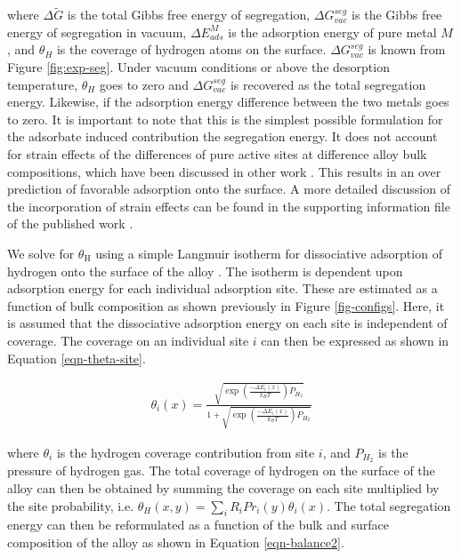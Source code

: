 \documentclass[12pt]{cmuthesis}
\begin{document}
\noindent
where \(\Delta \widetilde{G}\) is the total Gibbs free energy of segregation, \(\Delta G^{seg}_{vac}\) is the Gibbs free energy of segregation in vacuum, \(\Delta E^{M}_{ads}\) is the adsorption energy of pure metal \(M\), and \(\theta_{H}\) is the coverage of hydrogen atoms on the surface. \(\Delta G^{seg}_{vac}\) is known from Figure \ref{fig:exp-seg}.  Under vacuum conditions or above the desorption temperature, \(\theta_{H}\) goes to zero and \(\Delta G^{seg}_{vac}\) is recovered as the total segregation energy. Likewise, if the adsorption energy difference between the two metals goes to zero. It is important to note that this is the simplest possible formulation for the adsorbate induced contribution the segregation energy. It does not account for strain effects of the differences of pure active sites at difference alloy bulk compositions, which have been discussed in other work \cite{roudgar-2005-hydrog}. This results in an over prediction of favorable adsorption onto the surface. A more detailed discussion of the incorporation of strain effects can be found in the supporting information file of the published work \cite{boes-2015-estim-bulk}.

We solve for \(\theta_{\text{H}}\) using a simple Langmuir isotherm for dissociative adsorption of hydrogen onto the surface of the alloy \cite{miller-2012-segreg-at}. The isotherm is dependent upon adsorption energy for each individual adsorption site. These are estimated as a function of bulk composition as shown previously in Figure \ref{fig-configs}. Here, it is assumed that the dissociative adsorption energy on each site is independent of coverage. The coverage on an individual site \(i\) can then be expressed as shown in Equation \eqref{eqn-theta-site}.

\begin{eqnarray}
\theta_{i} (x) = \frac{\sqrt{\exp\left(\frac{-\Delta E_{i}(x)}{k_{B} T}\right) P_{H_2}}}{1 + \sqrt{\exp\left(\frac{-\Delta E_{i}(x)}{k_{B} T}\right) P_{H_2}}}
\label{eqn-theta-site}
\end{eqnarray}

\noindent
where \(\theta_{i}\) is the hydrogen coverage contribution from site \(i\), and \(P_{H_2}\) is the pressure of hydrogen gas. The total coverage of hydrogen on the surface of the alloy can then be obtained by summing the coverage on each site multiplied by the site probability, i.e. \(\theta_{H} (x,y) = \sum\limits_i R_{i} Pr_{i}(y) \theta_{i} (x)\). The total segregation energy can then be reformulated as a function of the bulk and surface composition of the alloy as shown in Equation \eqref{eqn-balance2}.
\end{document}

